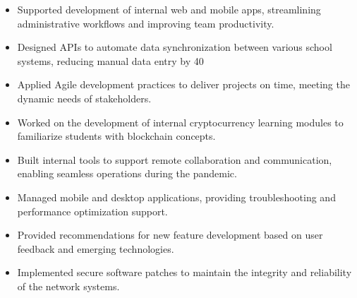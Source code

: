 \par\smallskip
\noindent
\begin{minipage}{20cm}
  \begin{minipage}{9.75cm}
    \begin{itemize}
      \item Supported development of internal web and mobile apps, streamlining administrative workflows and improving team productivity.
      \item Designed APIs to automate data synchronization between various school systems, reducing manual data entry by 40%
    \end{itemize}
  \end{minipage}
  \hfill
  \begin{minipage}{9.75cm}
    \begin{itemize}
      \item Applied Agile development practices to deliver projects on time, meeting the dynamic needs of stakeholders.
      \item Worked on the development of internal cryptocurrency learning modules to familiarize students with blockchain concepts.
    \end{itemize}
  \end{minipage}
\end{minipage}
\par\smallskip
\divider

\par\smallskip
\noindent
\begin{minipage}{20cm}
  \begin{minipage}{9.75cm}
    \begin{itemize}
      \item Built internal tools to support remote collaboration and communication, enabling seamless operations during the pandemic.
      \item Managed mobile and desktop applications, providing troubleshooting and performance optimization support.
    \end{itemize}
  \end{minipage}
  \hfill
  \begin{minipage}{9.75cm}
    \begin{itemize}
      \item Provided recommendations for new feature development based on user feedback and emerging technologies.
      \item Implemented secure software patches to maintain the integrity and reliability of the network systems.
    \end{itemize}
  \end{minipage}
\end{minipage}


